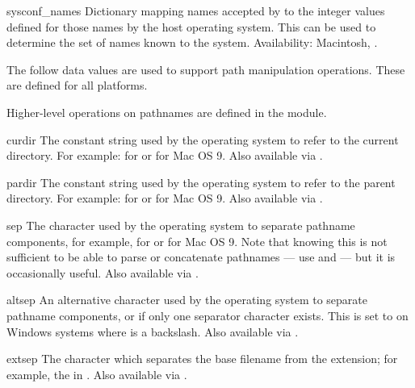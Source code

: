 \begin{datadesc}{sysconf_names}
Dictionary mapping names accepted by  to the
integer values defined for those names by the host operating system.
This can be used to determine the set of names known to the system.
Availability: Macintosh, \UNIX.
\end{datadesc}


The follow data values are used to support path manipulation
operations.  These are defined for all platforms.

Higher-level operations on pathnames are defined in the
 module.


\begin{datadesc}{curdir}
The constant string used by the operating system to refer to the current
directory.
For example:  for \POSIX{} or  for Mac OS 9.
Also available via .
\end{datadesc}

\begin{datadesc}{pardir}
The constant string used by the operating system to refer to the parent
directory.
For example:  for \POSIX{} or  for Mac OS 9.
Also available via .
\end{datadesc}

\begin{datadesc}{sep}
The character used by the operating system to separate pathname components,
for example, \character{/} for \POSIX{} or \character{:} for
Mac OS 9.  Note that knowing this is not sufficient to be able to
parse or concatenate pathnames --- use  and
 --- but it is occasionally useful.
Also available via .
\end{datadesc}

\begin{datadesc}{altsep}
An alternative character used by the operating system to separate pathname
components, or  if only one separator character exists.  This is
set to \character{/} on Windows systems where  is a
backslash.
Also available via .
\end{datadesc}

\begin{datadesc}{extsep}
The character which separates the base filename from the extension;
for example, the  in .
Also available via .
\end{datadesc}

